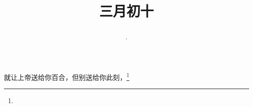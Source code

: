 \title{\date[d=18,m=4,y=2024][year:cn-y,年,month:cn,day:cn,日,·,weekday]·三月初十 }
就让上帝送给你百合，但别送给你此刻，\footnote{ }


